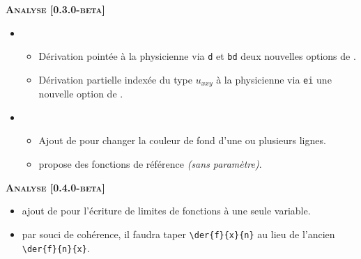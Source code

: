 \documentclass[12pt,a4paper]{book}
\begin{document}
\begin{description}
\begin{itemize}[itemsep=.5em]
    
\end{itemize}


\begin{center}
    \textbf{\textsc{Analyse [0.3.0-beta]}}
\end{center}

\begin{itemize}[itemsep=.5em]
    \item {}
    \begin{itemize}[itemsep=.5em]
        \item Dérivation pointée à la physicienne via \verb+d+ et \verb+bd+ deux nouvelles options de .

        \item Dérivation partielle indexée du type $u_{xxy}$ à la physicienne via \verb+ei+ une nouvelle option de .
    \end{itemize}



    


    \item {}
    \begin{itemize}[itemsep=.5em]
        \item Ajout de  pour changer la couleur de fond d'une ou plusieurs lignes.


        \item {} propose des fonctions de référence \emph{(sans paramètre)}.
    \end{itemize}



    
\end{itemize}


\begin{center}
    \textbf{\textsc{Analyse [0.4.0-beta]}}
\end{center}

\begin{itemize}[itemsep=.5em]
    \item {}
          ajout de  pour l'écriture de limites de fonctions à une seule variable.


    

    \item {}
          par souci de cohérence, il faudra taper \verb#\der{f}{x}{n}# au lieu de l'ancien \verb#\der{f}{n}{x}#.


\end{itemize}
\end{description}
\end{document}
